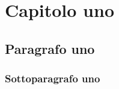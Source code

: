 \documentclass[crop=false]{standalone}
\begin{document}
	\chapter{Capitolo uno}
		\lipsum[1-5]
	\section{Paragrafo uno}
		\lipsum[1-5]
	\subsection{Sottoparagrafo uno}
		\lipsum[1-5]
\end{document}
